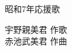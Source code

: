 \documentclass[10pt,b5j]{tarticle} %
\begin{document}
\begin{minipage}[c]{0.7\hsize} %
    \begin{center}
        {\LARGE
            昭和7年応援歌 %
        }
        {\small 
        }
    \end{center}
\end{minipage}
\begin{minipage}[c]{0.3\hsize} %
    \begin{flushright} %
        宇野親美君 作歌\\赤池武美君 作曲 %
    \end{flushright}
\end{minipage}
\end{document}
